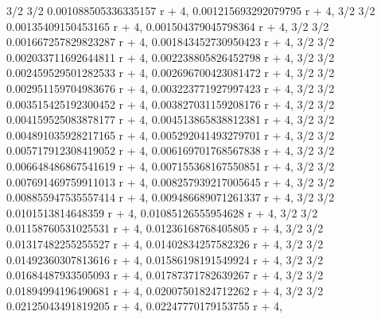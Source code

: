 \documentclass[12pt,arial,letterpaper]{book}
\begin{document}
\begin{eulercomment}
\begin{eulercomment}
\begin{eulercomment}
\begin{eulercomment}
\begin{eulercomment}
\begin{eulercomment}
\begin{eulercomment}
\begin{eulercomment}
\begin{eulercomment}
\begin{eulercomment}
\begin{eulercomment}
\begin{eulercomment}
\begin{eulercomment}
\begin{eulercomment}
\begin{eulercomment}
\begin{eulercomment}
\begin{eulercomment}
\begin{eulercomment}
\begin{eulercomment}
\begin{eulercomment}
\begin{eulercomment}
\begin{eulercomment}
\begin{euleroutput}
                        3/2                            3/2
  0.001088505336335157 r    + 4, 0.001215693292079795 r    + 4, 
                       3/2                            3/2
  0.00135409150453165 r    + 4, 0.001504379045798364 r    + 4, 
                        3/2                            3/2
  0.001667257829823287 r    + 4, 0.001843452730950423 r    + 4, 
                        3/2                            3/2
  0.002033711692644811 r    + 4, 0.002238805826452798 r    + 4, 
                        3/2                            3/2
  0.002459529501282533 r    + 4, 0.002696700423081472 r    + 4, 
                        3/2                            3/2
  0.002951159704983676 r    + 4, 0.003223771927997423 r    + 4, 
                        3/2                            3/2
  0.003515425192300452 r    + 4, 0.003827031159208176 r    + 4, 
                        3/2                            3/2
  0.004159525083878177 r    + 4, 0.004513865838812381 r    + 4, 
                        3/2                            3/2
  0.004891035928217165 r    + 4, 0.005292041493279701 r    + 4, 
                        3/2                            3/2
  0.005717912308419052 r    + 4, 0.006169701768567838 r    + 4, 
                        3/2                            3/2
  0.006648486867541619 r    + 4, 0.007155368167550851 r    + 4, 
                        3/2                            3/2
  0.007691469759911013 r    + 4, 0.008257939217005645 r    + 4, 
                        3/2                            3/2
  0.008855947535557414 r    + 4, 0.009486689071261337 r    + 4, 
                      3/2                           3/2
  0.0101513814648359 r    + 4, 0.01085126555954628 r    + 4, 
                       3/2                           3/2
  0.01158760531025531 r    + 4, 0.01236168768405805 r    + 4, 
                       3/2                           3/2
  0.01317482255255527 r    + 4, 0.01402834257582326 r    + 4, 
                       3/2                           3/2
  0.01492360307813616 r    + 4, 0.01586198191549924 r    + 4, 
                       3/2                           3/2
  0.01684487933505093 r    + 4, 0.01787371782639267 r    + 4, 
                       3/2                           3/2
  0.01894994196490681 r    + 4, 0.02007501824712262 r    + 4, 
                       3/2                           3/2
  0.02125043491819205 r    + 4, 0.02247770179153755 r    + 4, 

\end{euleroutput}
\end{eulercomment}
\end{eulercomment}
\end{eulercomment}
\end{eulercomment}
\end{eulercomment}
\end{eulercomment}
\end{eulercomment}
\end{eulercomment}
\end{eulercomment}
\end{eulercomment}
\end{eulercomment}
\end{eulercomment}
\end{eulercomment}
\end{eulercomment}
\end{eulercomment}
\end{eulercomment}
\end{eulercomment}
\end{eulercomment}
\end{eulercomment}
\end{eulercomment}
\end{eulercomment}
\end{eulercomment}
\end{document}
